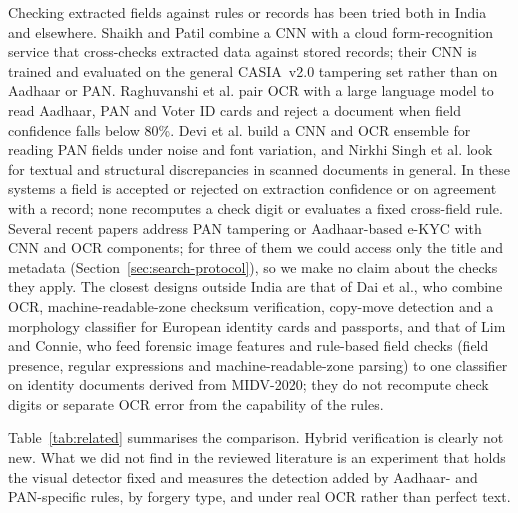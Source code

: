 \documentclass[VANCOUVER,Times1COL]{WileyNJDv5}
\begin{document}
Checking extracted fields against rules or records has been tried both
in India and elsewhere. Shaikh and Patil\cite{shaikh} combine a CNN
with a cloud form-recognition service that cross-checks extracted data
against stored records; their CNN is trained and evaluated on the
general CASIA~v2.0 tampering set rather than on Aadhaar or PAN.
Raghuvanshi et al.\cite{raghuvanshi} pair OCR with a large language
model to read Aadhaar, PAN and Voter ID cards and reject a document when
field confidence falls below 80\%. Devi et al.\cite{panens} build a
CNN and OCR ensemble for reading PAN fields under noise and font
variation, and Nirkhi Singh et al.\cite{nirkhi} look for textual and
structural discrepancies in scanned documents in general. In these
systems a field is accepted or rejected on extraction confidence or on
agreement with a record; none recomputes a check digit or evaluates a
fixed cross-field rule. Several recent papers address PAN
tampering or Aadhaar-based e-KYC with CNN and OCR
components\cite{lalsudhesh,arora,hamza,muralikrishna}; for three of
them we could access only the title and metadata
(Section~\ref{sec:search-protocol}), so we make no claim about the
checks they apply. The closest designs outside India are that of Dai
et al.\cite{dai}, who combine OCR, machine-readable-zone checksum
verification, copy-move detection and a morphology classifier for
European identity cards and passports, and that of Lim and
Connie\cite{limconnie}, who feed forensic image features and
rule-based field checks (field presence, regular expressions and
machine-readable-zone parsing) to one classifier on identity documents
derived from MIDV-2020; they do not recompute check digits or separate
OCR error from the capability of the rules.

Table~\ref{tab:related} summarises the comparison. Hybrid verification
is clearly not new. What we did not find in the reviewed literature is
an experiment that holds the visual detector fixed and measures the
detection added by Aadhaar- and PAN-specific rules, by forgery type, and
under real OCR rather than perfect text.
\end{document}
